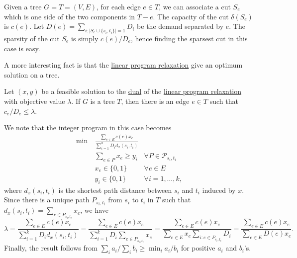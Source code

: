 \begin{eg}[Tree]
	Given a tree \(G = T = (V, E)\), for each edge \(e \in T\), we can associate a cut \(S_e\) which is one side of the two components in \(T - e\). The capacity of the cut \(\delta (S_e)\) is \(c(e)\). Let \(D(e) = \sum_{i\colon \lvert S_e \cup \{ s_i, t_i \} \rvert = 1} D_i \) be the demand separated by \(e\). The sparsity of the cut \(S_e\) is simply \(c(e) / D_e\), hence finding the \hyperref[prb:sparsest-cut]{sparsest cut} in this case is easy.

	A more interesting fact is that the \hyperref[eq:non-uniform-sparsest-cut-LP-primal]{linear program relaxation} give an optimum solution on a tree.

	\begin{claim}
		Let \((x, y)\) be a feasible solution to the \hyperref[eq:non-uniform-sparsest-cut-LP-dual]{dual} of the \hyperref[eq:non-uniform-sparsest-cut-LP-primal]{linear program relaxation} with objective value \(\lambda \). If \(G\) is a tree \(T\), then there is an edge \(e \in T\) such that \(c_e / D_e \leq \lambda \).
	\end{claim}
	\begin{explanation}
		We note that the integer program in this case becomes
		\[
			\begin{aligned}
				\min~ & \frac{\sum_{e \in E} c(e) x_e}{\sum_{i=1}^{k} D_i d_x(s_i, t_i)}                                         \\
				      & \sum_{e \in P} x_e \geq y_i                                      & \forall P \in \mathcal{P} _{s_i, t_i} \\
				      & x_e \in \{ 0, 1 \}                                               & \forall e \in E                       \\
				      & y_i \in \{ 0, 1 \}                                               & \forall i = 1, \dots , k,
			\end{aligned}
		\]
		where \(d_x(s_i, t_i)\) is the shortest path distance between \(s_i\) and \(t_i\) induced by \(x\). Since there is a unique path \(P_{s_i, t_i}\) from \(s_i\) to \(t_i\) in \(T\) such that \(d_x(s_i, t_i) = \sum_{e \in P_{s_i, t_i}} x_e\), we have
		\[
			\lambda
			= \frac{\sum_{e \in E} c(e) x_e}{\sum_{i=1}^{k} D_i d_x(s_i, t_i)}
			= \frac{\sum_{e \in E} c(e) x_e}{\sum_{i=1}^{k} D_i \sum_{e \in P_{s_i, t_i}} x_e}
			= \frac{\sum_{e \in E} c(e) x_e}{\sum_{e \in E} x_e \sum_{i \colon e \in P_{s_i, t_i}} D_i}
			= \frac{\sum_{e \in E} c(e) x_e}{\sum_{e \in E} D(e) x_e }.
		\]
		Finally, the result follows from \(\sum_{i} a_i / \sum_{i} b_i \geq \min _i a_i / b_i\) for positive \(a_i\) and \(b_i\)'s.
	\end{explanation}
\end{eg}


